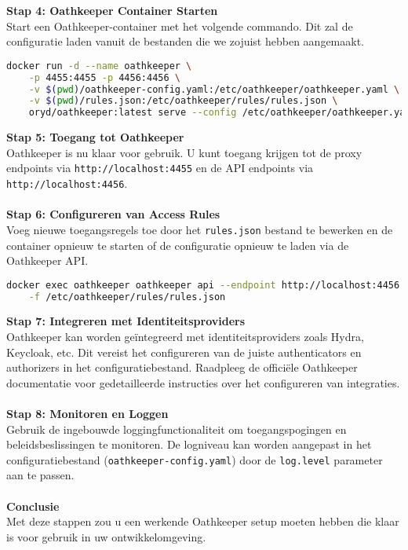 \textbf{Stap 4: Oathkeeper Container Starten}\\
Start een Oathkeeper-container met het volgende commando. Dit zal de configuratie laden vanuit de bestanden die we zojuist hebben aangemaakt.
\begin{lstlisting}[language=bash]
docker run -d --name oathkeeper \
    -p 4455:4455 -p 4456:4456 \
    -v $(pwd)/oathkeeper-config.yaml:/etc/oathkeeper/oathkeeper.yaml \
    -v $(pwd)/rules.json:/etc/oathkeeper/rules/rules.json \
    oryd/oathkeeper:latest serve --config /etc/oathkeeper/oathkeeper.yaml
\end{lstlisting}
\textbf{Stap 5: Toegang tot Oathkeeper}\\
Oathkeeper is nu klaar voor gebruik. U kunt toegang krijgen tot de proxy endpoints via \texttt{http://localhost:4455} en de API endpoints via \texttt{http://localhost:4456}.\\\\
\textbf{Stap 6: Configureren van Access Rules}\\
Voeg nieuwe toegangsregels toe door het \texttt{rules.json} bestand te bewerken en de container opnieuw te starten of de configuratie opnieuw te laden via de Oathkeeper API.\@
\begin{lstlisting}[language=bash]
docker exec oathkeeper oathkeeper api --endpoint http://localhost:4456 rules create \
    -f /etc/oathkeeper/rules/rules.json
\end{lstlisting}
\textbf{Stap 7: Integreren met Identiteitsproviders}\\
Oathkeeper kan worden geïntegreerd met identiteitsproviders zoals Hydra, Keycloak, etc. Dit vereist het configureren van de juiste authenticators en authorizers in het configuratiebestand. Raadpleeg de officiële Oathkeeper documentatie voor gedetailleerde instructies over het configureren van integraties.\\\\
\textbf{Stap 8: Monitoren en Loggen}\\
Gebruik de ingebouwde loggingfunctionaliteit om toegangspogingen en beleidsbeslissingen te monitoren. De logniveau kan worden aangepast in het configuratiebestand (\texttt{oathkeeper-config.yaml}) door de \texttt{log.level} parameter aan te passen.\\\\
\textbf{Conclusie}\\
Met deze stappen zou u een werkende Oathkeeper setup moeten hebben die klaar is voor gebruik in uw ontwikkelomgeving.



